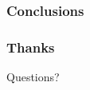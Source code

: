 \documentclass[red]{beamer}
\begin{document}
%
%
%
%
%
%

\begin{frame}
	\frametitle{Conclusions}
\end{frame}

\begin{frame}
	\frametitle{Thanks}
	
	\begin{center}
		\large{Questions?}
	\end{center}
\end{frame}
\end{document}
